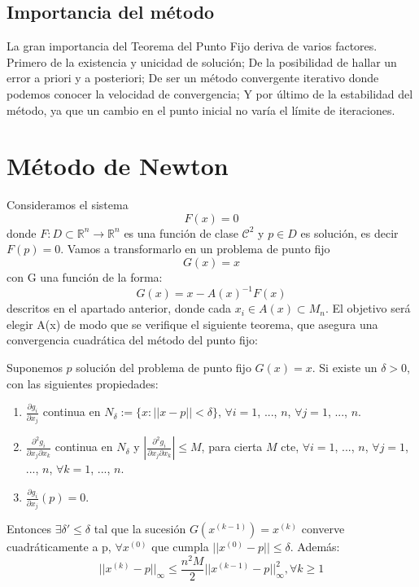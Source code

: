 \subsection{Importancia del método}

La gran importancia del Teorema del Punto Fijo deriva de varios factores. Primero de la existencia y unicidad de solución; De la posibilidad de hallar un error a priori y a posteriori; De ser un método convergente iterativo donde podemos conocer la velocidad de convergencia; Y por último de la estabilidad del método, ya que un cambio en el punto inicial no varía el límite de iteraciones.

\section{Método de Newton}

Consideramos el sistema $$F(x)=0$$ donde $F: D \subset \mathbb{R}^{n} \longrightarrow \mathbb{R}^n$ es una función de clase $\mathcal{C}^{2}$ y $p \in D$ es solución, es decir $F(p) = 0$.
Vamos a transformarlo en un problema de punto fijo $$G(x) = x$$ con G una función de la forma:
\[G(x) = x - A(x)^{-1} F(x)\]
descritos en el apartado anterior, donde cada $x_{i} \in A(x) \subset M_{n}$. El objetivo será elegir A(x) de modo que se verifique el siguiente teorema, que asegura una convergencia cuadrática del método del punto fijo:\\

\begin{theorem}\label{TPF}
	Suponemos $p$ solución del problema de punto fijo $G(x) = x$. Si existe un $\delta > 0$, con las siguientes propiedades:
	\begin{enumerate}
		\item $\frac{\partial g_i}{\partial x_j}$ continua en $N_\delta := \{x : ||x-p|| < \delta\}$, $\forall i = 1$, ..., $n$, $\forall j = 1$, ..., $n$.
		\item $\frac{\partial^2 g_i}{\partial x_j\partial x_k}$ continua en $N_\delta$ y $\left|\frac{\partial^2 g_i}{\partial x_j\partial x_k}\right| \leq M$, para cierta $M$ cte, $\forall i = 1$, ..., $n$, $\forall j = 1$, ..., $n$, $\forall k = 1$, ..., $n$.
		\item $\frac{\partial g_i}{\partial x_j} (p) = 0$.
	\end{enumerate}
	Entonces $\exists \delta' \leq \delta$ tal que la sucesión $G(x^{(k-1)}) = x^{(k)}$ converve cuadráticamente a p, $\forall x^{(0)}$ que cumpla $||x^{(0)}-p|| \leq \delta$. Además:
	\[||x^{(k)}-p||_\infty \leq \frac{n^2 M}{2} ||x^{(k-1)}-p||^2_\infty, \forall k \geq 1\]
\end{theorem}

